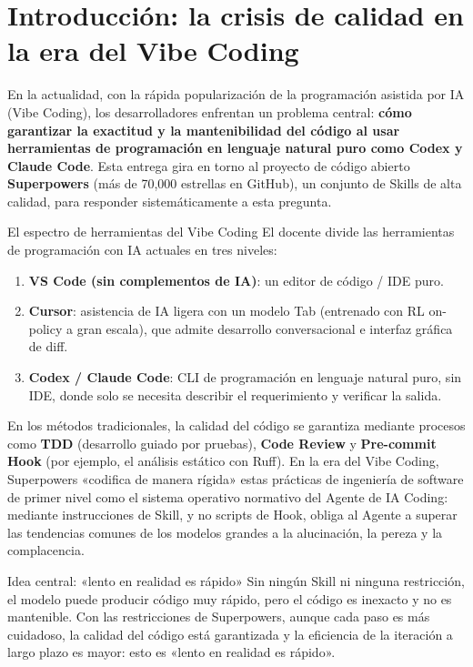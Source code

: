 \section{Introducción: la crisis de calidad en la era del Vibe Coding}

En la actualidad, con la rápida popularización de la programación asistida por IA (Vibe Coding), los desarrolladores enfrentan un problema central: \textbf{cómo garantizar la exactitud y la mantenibilidad del código al usar herramientas de programación en lenguaje natural puro como Codex y Claude Code}. Esta entrega gira en torno al proyecto de código abierto \textbf{Superpowers} (más de 70,000 estrellas en GitHub), un conjunto de Skills de alta calidad, para responder sistemáticamente a esta pregunta.

\begin{knowledgebox}{El espectro de herramientas del Vibe Coding}
El docente divide las herramientas de programación con IA actuales en tres niveles:
\begin{enumerate}
    \item \textbf{VS Code (sin complementos de IA)}: un editor de código / IDE puro.
    \item \textbf{Cursor}: asistencia de IA ligera con un modelo Tab (entrenado con RL on-policy a gran escala), que admite desarrollo conversacional e interfaz gráfica de diff.
    \item \textbf{Codex / Claude Code}: CLI de programación en lenguaje natural puro, sin IDE, donde solo se necesita describir el requerimiento y verificar la salida.
\end{enumerate}
\end{knowledgebox}

En los métodos tradicionales, la calidad del código se garantiza mediante procesos como \textbf{TDD} (desarrollo guiado por pruebas), \textbf{Code Review} y \textbf{Pre-commit Hook} (por ejemplo, el análisis estático con Ruff). En la era del Vibe Coding, Superpowers «codifica de manera rígida» estas prácticas de ingeniería de software de primer nivel como el sistema operativo normativo del Agente de IA Coding: mediante instrucciones de Skill, y no scripts de Hook, obliga al Agente a superar las tendencias comunes de los modelos grandes a la alucinación, la pereza y la complacencia.

\begin{importantbox}{Idea central: «lento en realidad es rápido»}
Sin ningún Skill ni ninguna restricción, el modelo puede producir código muy rápido, pero el código es inexacto y no es mantenible. Con las restricciones de Superpowers, aunque cada paso es más cuidadoso, la calidad del código está garantizada y la eficiencia de la iteración a largo plazo es mayor: esto es «lento en realidad es rápido».
\end{importantbox}


